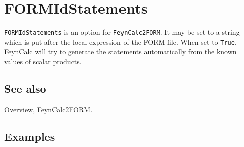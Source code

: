\documentclass[../FeynCalcManual.tex]{subfiles}
\begin{document}
\hypertarget{formidstatements}{%
\section{FORMIdStatements}\label{formidstatements}}

\texttt{FORMIdStatements} is an option for \texttt{FeynCalc2FORM}. It
may be set to a string which is put after the local expression of the
FORM-file. When set to \texttt{True}, FeynCalc will try to generate the
statements automatically from the known values of scalar products.

\subsection{See also}

\hyperlink{toc}{Overview}, \hyperlink{feyncalc2form}{FeynCalc2FORM}.

\subsection{Examples}
\end{document}
